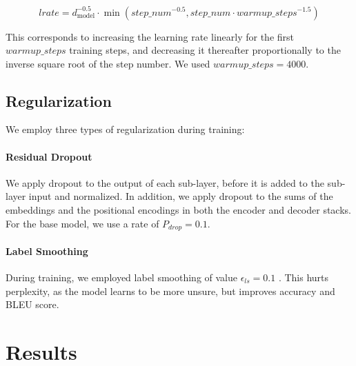 \documentclass{article}
\newcommand{\dmodel}{d_{\text{model}}}
\begin{document}
\begin{equation}
lrate = \dmodel^{-0.5} \cdot
  \min({step\_num}^{-0.5},
    {step\_num} \cdot {warmup\_steps}^{-1.5})
\end{equation}

This corresponds to increasing the learning rate linearly for the first $warmup\_steps$ training steps, and decreasing it thereafter proportionally to the inverse square root of the step number.  We used $warmup\_steps=4000$.

\subsection{Regularization} \label{sec:reg}

We employ three types of regularization during training: 
\paragraph{Residual Dropout} We apply dropout \citep{srivastava2014dropout} to the output of each sub-layer, before it is added to the sub-layer input and normalized.   In addition, we apply dropout to the sums of the embeddings and the positional encodings in both the encoder and decoder stacks.  For the base model, we use a rate of $P_{drop}=0.1$.

\paragraph{Label Smoothing} During training, we employed label smoothing of value $\epsilon_{ls}=0.1$ \citep{DBLP:journals/corr/SzegedyVISW15}.  This hurts perplexity, as the model learns to be more unsure, but improves accuracy and BLEU score.

\section{Results} \label{sec:results}
\end{document}
